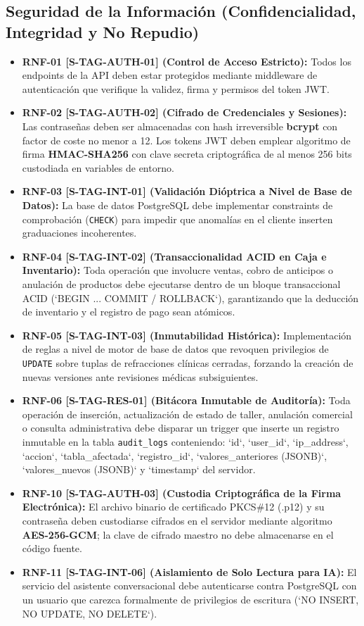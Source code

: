 \documentclass[12pt,a4paper]{report}
\begin{document}
\subsection{Seguridad de la Información (Confidencialidad, Integridad y No Repudio)}
\begin{itemize}
    \item \textbf{RNF-01 [S-TAG-AUTH-01] (Control de Acceso Estricto):} Todos los endpoints de la API deben estar protegidos mediante middleware de autenticación que verifique la validez, firma y permisos del token JWT.
    \item \textbf{RNF-02 [S-TAG-AUTH-02] (Cifrado de Credenciales y Sesiones):} Las contraseñas deben ser almacenadas con hash irreversible \textbf{bcrypt} con factor de coste no menor a 12. Los tokens JWT deben emplear algoritmo de firma \textbf{HMAC-SHA256} con clave secreta criptográfica de al menos 256 bits custodiada en variables de entorno.
    \item \textbf{RNF-03 [S-TAG-INT-01] (Validación Dióptrica a Nivel de Base de Datos):} La base de datos PostgreSQL debe implementar constraints de comprobación (\texttt{CHECK}) para impedir que anomalías en el cliente inserten graduaciones incoherentes.
    \item \textbf{RNF-04 [S-TAG-INT-02] (Transaccionalidad ACID en Caja e Inventario):} Toda operación que involucre ventas, cobro de anticipos o anulación de productos debe ejecutarse dentro de un bloque transaccional ACID (`BEGIN ... COMMIT / ROLLBACK`), garantizando que la deducción de inventario y el registro de pago sean atómicos.
    \item \textbf{RNF-05 [S-TAG-INT-03] (Inmutabilidad Histórica):} Implementación de reglas a nivel de motor de base de datos que revoquen privilegios de \texttt{UPDATE} sobre tuplas de refracciones clínicas cerradas, forzando la creación de nuevas versiones ante revisiones médicas subsiguientes.
    \item \textbf{RNF-06 [S-TAG-RES-01] (Bitácora Inmutable de Auditoría):} Toda operación de inserción, actualización de estado de taller, anulación comercial o consulta administrativa debe disparar un trigger que inserte un registro inmutable en la tabla \texttt{audit\_logs} conteniendo: `id`, `user\_id`, `ip\_address`, `accion`, `tabla\_afectada`, `registro\_id`, `valores\_anteriores (JSONB)`, `valores\_nuevos (JSONB)` y `timestamp` del servidor.
    \item \textbf{RNF-10 [S-TAG-AUTH-03] (Custodia Criptográfica de la Firma Electrónica):} El archivo binario de certificado PKCS\#12 (.p12) y su contraseña deben custodiarse cifrados en el servidor mediante algoritmo \textbf{AES-256-GCM}; la clave de cifrado maestro no debe almacenarse en el código fuente.
    \item \textbf{RNF-11 [S-TAG-INT-06] (Aislamiento de Solo Lectura para IA):} El servicio del asistente conversacional debe autenticarse contra PostgreSQL con un usuario que carezca formalmente de privilegios de escritura (`NO INSERT, NO UPDATE, NO DELETE`).
\end{itemize}
\end{document}
